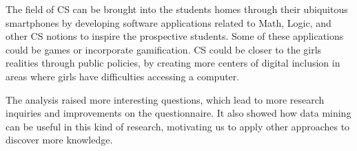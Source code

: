 The field of CS can be brought into the students homes through their ubiquitous smartphones by developing software applications related to Math, Logic, and other CS notions to inspire the prospective students. Some of these  applications could be games or incorporate gamification. CS could be closer to the girls realities through public policies, by creating more centers of digital inclusion in areas where girls have difficulties accessing a computer.

The analysis raised more interesting questions, which lead to more research inquiries and improvements on the questionnaire. It also showed how data mining can be useful in this kind of research, motivating us to apply other approaches to discover more knowledge.
